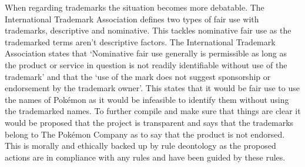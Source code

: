 \documentclass[a4paper]{article}
\newcommand{\Pokemon}{Pok\'{e}mon}
\begin{document}
\par
When regarding trademarks the situation becomes more debatable.
The International Trademark Association defines two types of fair use with trademarks, descriptive and nominative.
This tackles nominative fair use as the trademarked terms aren't descriptive factors.
The International Trademark Association states that `Nominative fair use generally is permissible as long as the product or service in question is not readily identifiable without use of the trademark' and that the `use of the mark does not suggest sponsorship or endorsement by the trademark owner'\cite{ITA}.
This states that it would be fair use to use the names of \Pokemon{} as it would be infeasible to identify them without using the trademarked names.
To further compile and make sure that things are clear it would be proposed that the project is transparent and says that the trademarks belong to The \Pokemon{} Company as to say that the product is not endorsed.
This is morally and ethically backed up by rule deontology as the proposed actions are in compliance with any rules and have been guided by these rules.



\end{document}
